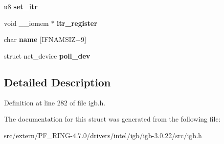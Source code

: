\begin{DoxyCompactItemize}
\item 
\hypertarget{structigb__q__vector_accaee4ddb3984fe9a350a0877538f150}{
u8 {\bfseries set\_\-itr}}
\label{structigb__q__vector_accaee4ddb3984fe9a350a0877538f150}

\item 
\hypertarget{structigb__q__vector_a0e4afc264be717d3e7f38956004e2671}{
void \_\-\_\-iomem $\ast$ {\bfseries itr\_\-register}}
\label{structigb__q__vector_a0e4afc264be717d3e7f38956004e2671}

\item 
\hypertarget{structigb__q__vector_a2686974868d86d95f0798aebc9f1f57a}{
char {\bfseries name} \mbox{[}IFNAMSIZ+9\mbox{]}}
\label{structigb__q__vector_a2686974868d86d95f0798aebc9f1f57a}

\item 
\hypertarget{structigb__q__vector_a6be2b7e04cf2749ace7f9d1d57adc2b1}{
struct net\_\-device {\bfseries poll\_\-dev}}
\label{structigb__q__vector_a6be2b7e04cf2749ace7f9d1d57adc2b1}

\end{DoxyCompactItemize}


\subsection{Detailed Description}


Definition at line 282 of file igb.h.



The documentation for this struct was generated from the following file:\begin{DoxyCompactItemize}
\item 
src/extern/PF\_\-RING-\/4.7.0/drivers/intel/igb/igb-\/3.0.22/src/igb.h\end{DoxyCompactItemize}
